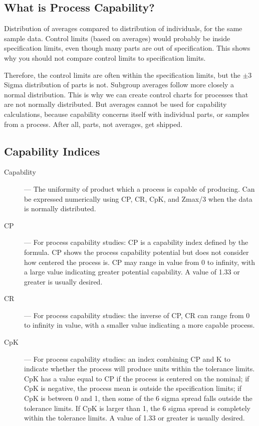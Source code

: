 \documentclass[]{report}
\begin{document}
\subsection{What is Process Capability?}

Distribution of averages compared to distribution of individuals, for the same sample data. Control limits (based on averages) would probably be inside specification limits, even though many parts are out of specification. This shows why you should not compare control limits to specification limits.

Therefore, the control limits are often within the specification limits, but the $\pm 3$ Sigma distribution of parts is not.  Subgroup averages follow more closely a normal distribution. This is why we can create control charts for processes that are not normally distributed. But averages cannot be used for capability calculations, because capability concerns itself with individual parts, or samples from a process. After all, parts, not averages, get shipped.

\subsection{Capability Indices}

\begin{description}
	\item[Capability] — The uniformity of product which a process is capable of producing. Can be expressed numerically using CP, CR, CpK, and Zmax/3 when the data is normally distributed.
	
	\item[CP] — For process capability studies: CP is a capability index defined by the formula. CP shows the process capability potential but does not consider how centered the process is. CP may range in value from 0 to infinity, with a large value indicating greater potential capability. A value of 1.33 or greater is usually desired.
	
	\item[CR] — For process capability studies: the inverse of CP, CR can range from 0 to infinity in value, with a smaller value indicating a more capable process.
	
	\item[CpK] — For process capability studies: an index combining CP and K to indicate whether the process will produce units within the tolerance limits. CpK has a value equal to CP if the process is centered on the nominal; if CpK is negative, the process mean is outside the specification limits; if CpK is between 0 and 1, then some of the 6 sigma spread falls outside the tolerance limits. If CpK is larger than 1, the 6 sigma spread is completely within the tolerance limits. A value of 1.33 or greater is usually desired.
\end{description}
\newpage
\end{document}
